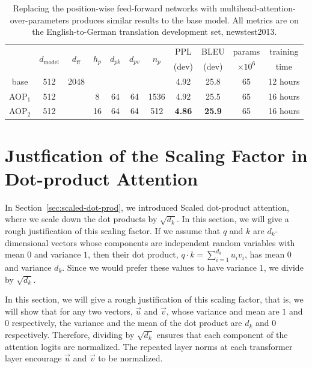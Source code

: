 \documentclass{article}
\newcommand{\dmodel}{d_{\text{model}}}
\newcommand{\dff}{d_{\text{ff}}}
\begin{document}
\begin{table}[h]
\caption{Replacing the position-wise feed-forward networks with multihead-attention-over-parameters produces similar results to the base model.  All metrics are on the English-to-German translation development set, newstest2013.}
\label{tab:parameter_attention}
\begin{center}
\vspace{-2mm}

\begin{tabular}{c|cccccc|cccc}
\hline\rule{0pt}{2.0ex}
 & \multirow{2}{*}{$\dmodel$} & \multirow{2}{*}{$\dff$} &
\multirow{2}{*}{$h_p$} & \multirow{2}{*}{$d_{pk}$} & \multirow{2}{*}{$d_{pv}$} &
 \multirow{2}{*}{$n_p$} &
 PPL & BLEU & params & training\\
 & & & & & &  & (dev) & (dev) & $\times10^6$ & time \\
\hline\rule{0pt}{2.0ex}
base & 512 & 2048 & & & & & 4.92 & 25.8 & 65 & 12 hours\\
\hline\rule{0pt}{2.0ex}
AOP$_1$ & 512 & & 8 & 64 & 64 & 1536 & 4.92& 25.5  & 65 & 16 hours\\
AOP$_2$ & 512 & & 16 & 64 & 64 & 512 & \textbf{4.86} & \textbf{25.9}  & 65 & 16 hours \\
\hline
\end{tabular}

\end{center}
\end{table}

\section*{Justfication of the Scaling Factor in Dot-product Attention}

In Section~\ref{sec:scaled-dot-prod}, we introduced Scaled dot-product attention, where we scale down the dot products by $\sqrt{d_k}$.   In this section, we will give a rough justification of this scaling factor.  If we assume that $q$ and $k$ are $d_k$-dimensional vectors whose components are independent random variables with mean $0$ and variance $1$, then their dot product, $q \cdot k = \sum_{i=1}^{d_k} u_iv_i$, has mean $0$ and variance $d_k$.  Since we would prefer these values to have variance $1$, we divide by $\sqrt{d_k}$.  

\iffalse

In this section, we will give a rough justification of this scaling factor, that is, we will show that for any two vectors, $\vec{u}$ and $\vec{v}$, whose variance and mean are $1$ and $0$ respectively, the variance and the mean of the dot product are $d_k$ and $0$ respectively. Therefore, dividing by $\sqrt{d_k}$ ensures that each component of the attention logits are normalized. The repeated layer norms at each transformer layer encourage $\vec{u}$ and $\vec{v}$ to be normalized. 
\end{document}
